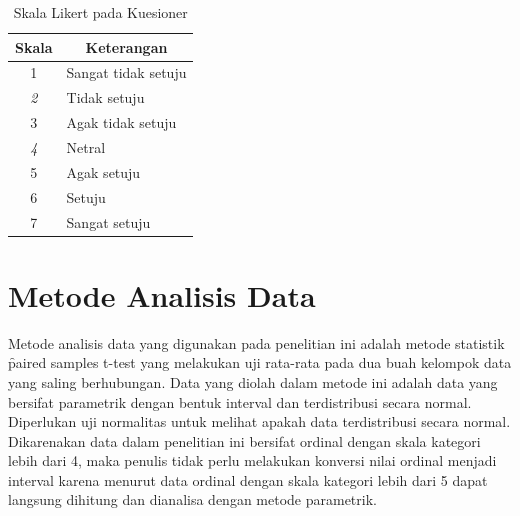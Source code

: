 \begin{enumerate}
\begin{enumerate}
		\begin{table}[h]
			\centering
			\caption{Skala Likert pada Kuesioner}
			\label{tab:tab2}
			\begin{tabular}{|c|l|}
				\hline
				{\bf Skala} & \multicolumn{1}{c|}{{\bf Keterangan}} \\ \hline
				1           & Sangat tidak setuju                   \\ \hline
				{\it 2}     & Tidak setuju                          \\ \hline
				3           & Agak tidak setuju                     \\ \hline
				{\it 4}     & Netral                                \\ \hline
				5           & Agak setuju                           \\ \hline
				6           & Setuju                                \\ \hline
				7           & Sangat setuju                         \\ \hline                      
			\end{tabular}
		\end{table}
	\end{enumerate}
\end{enumerate}
\section{Metode Analisis Data}
Metode analisis data yang digunakan pada penelitian ini adalah metode statistik \f{paired samples t-test} yang melakukan uji rata-rata pada dua buah kelompok data yang saling berhubungan. Data yang diolah dalam metode ini adalah data yang bersifat parametrik dengan bentuk interval dan terdistribusi secara normal. Diperlukan uji normalitas untuk melihat apakah data terdistribusi secara normal. Dikarenakan data dalam penelitian ini bersifat ordinal dengan skala kategori lebih dari 4, maka penulis tidak perlu melakukan konversi nilai ordinal menjadi interval karena menurut \citet{paper.jason} data ordinal dengan skala kategori lebih dari 5 dapat langsung dihitung dan dianalisa dengan metode parametrik.
